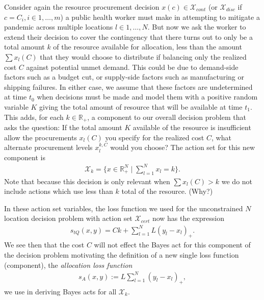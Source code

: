 \documentclass{article}
\begin{document}
Consider again the resource procurement decision $x(c) \in \mathcal{X}_{cont}$ (or $\mathcal{X}_{disc}$ if $c = C_i, i \in 1,\ldots,m$) a public health worker must make in 
attempting to mitigate a pandemic across multiple locations $l \in 1,\ldots,N$.  But now we ask the worker to extend their decision to cover the contingency that there turns out to only be a total amount $k$ of the resource available for allocation, less than the amount $\sum x_l(C)$ that they would choose to distribute if balancing only the realized cost $C$ against potential unmet demand.  This could be due to demand-side factors such as a budget cut, or supply-side factors such as manufacturing or shipping failures. In either case, we assume that these factors are undetermined at time $t_0$ when decisions must be made and model them with a positive random variable $K$ giving the total amount of resource that will be available
at time $t_1$.  This adds, for each $k \in \mathbb{R}_{+}$, a component to our overall decision problem that asks the question: If the total amount $K$ available of the resource is insufficient allow the procurements $x_l(C)$ you specify for the realized cost $C$, what alternate procurement levels $x_l^{k,C}$ would you choose? The action set for this new component is 
\begin{align}
\mathcal{X}_k = \{x \in \mathbb{R}_{+}^N \mid \sum_{l=1}^{N} x_l = k\}.
\end{align}
Note that because this decision is only relevant when $\sum x_l(C)>k$ we do not include actions which use less than $k$ total of the resource. (Why?)
 
In these action set variables, the loss function we used for the unconstrained $N$ location decision problem with action set $\mathcal{X}_{cert}$ now has the expression
\begin{align}
s_{tQ}\left(x, y\right) = Ck + \sum_{l=1}^{N} L(y_l - x_l)_{+}.
\end{align}
We see then that the cost $C$ will not effect the Bayes act for this component of the decision problem motivating the definition of a new single loss function (component), the \emph{allocation loss function}
\begin{align}
s_{A}(x,y):= L\sum_{l=1}^{N} (y_l - x_l)_{+},
\end{align}
we use in deriving Bayes acts for all $\mathcal{X}_k$.
\end{document}
